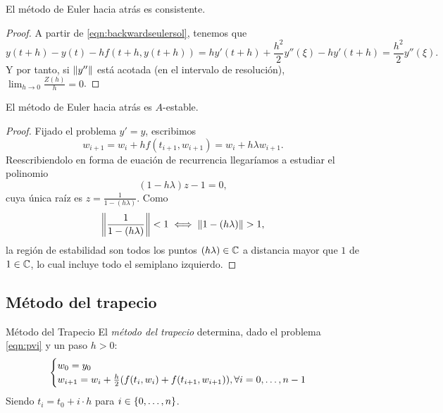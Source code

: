 \begin{proposition}
    El método de Euler hacia atrás es consistente.
\end{proposition}

\begin{proof}
    A partir de \eqref{eqn:backwardseulersol}, tenemos que 
    \begin{equation*}
        y(t + h) - y(t) - hf(t+h, y(t+h)) =
        hy'(t + h) + \frac{h^2}{2}y''(\xi) - hy'(t+h) =
        \frac{h^2}{2}y''(\xi).
    \end{equation*}
    Y por tanto, si $\norm{y''}$ está acotada (en el intervalo de resolución),
    $\lim_{h \to 0} \frac{Z(h)}{h} = 0$.
\end{proof}


\begin{proposition}
    El método de Euler hacia atrás es $A$-estable.
\end{proposition}

\begin{proof}
    Fijado el problema $y' = y$, escribimos
    \begin{equation*}
        w_{i+1} = w_i + hf(t_{i+1}, w_{i+1}) = w_i + h\lambda w_{i+1}.
    \end{equation*}
    Reescribiendolo en forma de euación de recurrencia
    llegaríamos a estudiar el polinomio
    \begin{equation*}
        (1 - h\lambda)z - 1 = 0,
    \end{equation*}
    cuya única raíz es $z = \frac{1}{1 - (h\lambda)}$.
    Como
    \begin{equation*}
        \norm{\frac{1}{1 - (h\lambda)}} < 1 \iff
        \norm{1 - (h\lambda)} > 1,
    \end{equation*}
    la región de estabilidad son todos los puntos $(h\lambda) \in \mathbb{C}$
    a distancia mayor que $1$ de $1 \in \mathbb{C}$,
    lo cual incluye todo el semiplano izquierdo.
\end{proof}

\subsection{Método del trapecio}

\begin{method}{Método del Trapecio}
    El \emph{método del trapecio} determina,
    dado el problema \ref{eqn:pvi} y un paso $h > 0$:
    \begin{equation}\label{eqn:trapezoidalsol}
    \begin{cases}
        w_0 = y_0 \\
        w_{i+1} = w_i + \frac{h}{2}\qty(
            f(t_i, w_i) + f(t_{i+1}, w_{i+1})
        ), \forall i=0,\dots, n-1
    \end{cases}
    \end{equation}
    Siendo $t_i = t_0 + i\cdot h$ para $i \in \qty{0,\ldots, n}$.
\end{method}

